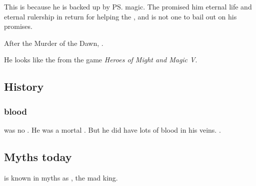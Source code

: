 This is because he is backed up by \ps{\Daggerrain}{} magic. 
The \banelord{} promised him eternal life and eternal rulership in return for helping the \banes, and \Daggerrain{} is not one to bail out on his promises. 

After the Murder of the Dawn, .

He looks like the \Liches{} from the game \emph{Heroes of Might and Magic V}. 









\subsection{History}





\subsubsection{\Aryoth blood}
\Semiza was no \aryoth. 
He was a mortal \nephil. 
But he did have lots of \aryoth blood in his veins. 
. 









\subsection{Myths today}
\Semiza{} is known in myths as , the mad king. 






































